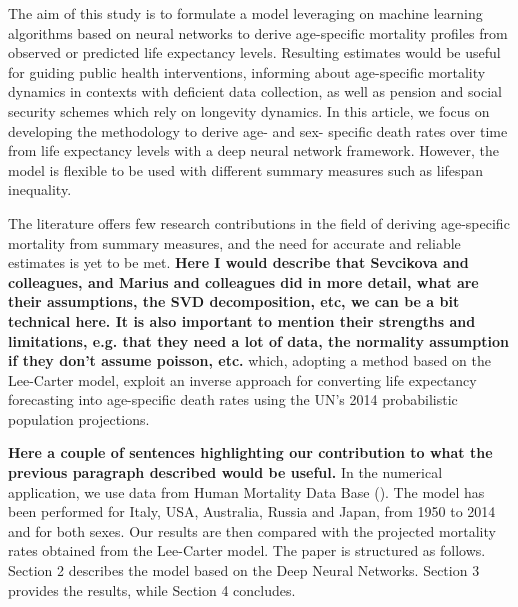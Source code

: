 \documentclass[a4,11pt]{article}
\begin{document}
The aim of this study is to formulate a model leveraging on machine learning algorithms based on neural networks to derive age-specific mortality profiles from observed or predicted life expectancy levels. Resulting estimates would be useful for guiding public health interventions, informing about age-specific mortality dynamics in contexts with deficient data collection, as well as pension and social security schemes which rely on longevity dynamics. In this article, we focus on developing the methodology to derive age- and sex- specific death rates over time from life expectancy levels with a deep neural network framework. However, the model is flexible to be used with different summary measures such as lifespan inequality.

The literature offers few research contributions in the field of deriving age-specific mortality from summary measures, and the need for accurate and reliable estimates is yet to be met. \textbf{Here I would describe that  Sevcikova and colleagues, and Marius and colleagues did in more detail, what are their assumptions, the SVD decomposition, etc, we can be a bit technical here. It is also important to mention their strengths and limitations, e.g. that they need a lot of data, the normality assumption if they don't assume poisson, etc.}  \cite{Sevcikova} which, adopting a method based on the Lee-Carter model, exploit an inverse approach for converting life expectancy forecasting into age-specific death rates using the UN’s 2014 probabilistic population projections. 


\textbf{Here a couple of sentences highlighting our contribution to what the previous paragraph described would be useful.}
In the numerical application, we use data from Human Mortality Data Base (\cite{HM}). The model has been performed for Italy, USA, Australia, Russia and Japan, from 1950 to 2014 and for both sexes. Our results are then compared with the projected mortality rates obtained from the Lee-Carter model.
The paper is structured as follows. Section 2 describes the model based on the Deep Neural Networks. Section 3 provides the results, while Section 4 concludes.

\end{document}
